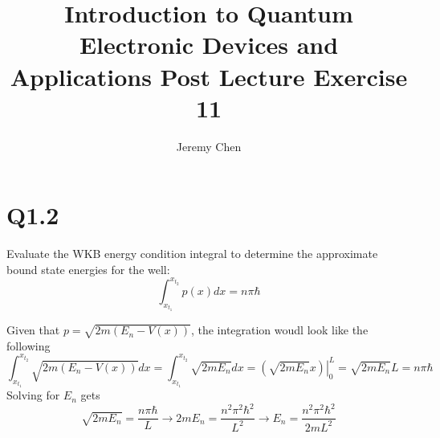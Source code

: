\documentclass[10pt,letterpaper]{article}
\title{Introduction to Quantum Electronic Devices and Applications Post Lecture Exercise 11}
\author{Jeremy Chen}
\begin{document}
	\maketitle

\section*{Q1.2}
Evaluate the WKB energy condition integral to determine the approximate bound state energies for the well:
$$\int_{x_{t_{1}}}^{x_{t_2}} p(x)dx = n\pi\hbar$$

\color{violet}
Given that $p = \sqrt{2m(E_{n} - V(x))}$, the integration woudl look like the following
$$\int_{x_{t_{1}}}^{x_{t_{2}}} \sqrt{2m(E_{n} - V(x))}dx = \int_{x_{t_{1}}}^{x_{t_{2}}} \sqrt{2mE_{n}}dx = \left. \left( \sqrt{2mE_{n}}x \right)\right|_{0}^{L} = \sqrt{2mE_{n}}L = n\pi\hbar$$
Solving for $E_{n}$ gets
$$\sqrt{2mE_{n}} = \frac{n\pi\hbar}{L} \longrightarrow 2mE_{n} = \frac{n^{2}\pi^{2}\hbar^{2}}{L^{2}} \longrightarrow E_{n} = \frac{n^{2}\pi^{2}\hbar^{2}}{2mL^{2}}$$
\color{black}
\end{document}
